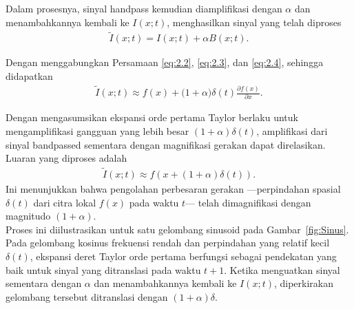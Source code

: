 Dalam prosesnya, sinyal handpass kemudian diamplifikasi dengan \(\alpha \) dan menambahkannya kembali ke \(I(x; t)\), menghasilkan sinyal yang telah diproses
\begin{equation} \label{eq:2.4}
\begin{aligned}
{\tilde I(x; t)  =  I(x; t)  +  }\alpha {B(x; t)}.
\end{aligned}
\end{equation}


Dengan menggabungkan Persamaan \ref{eq:2.2}, \ref{eq:2.3}, dan \ref{eq:2.4}, sehingga didapatkan 
\begin{equation} \label{eq:2.5}
\begin{aligned}
\tilde I(x; t) \approx {f(x)  +  (1 + }\alpha)\delta {(t)}\frac{{\partial f(x)}}{{\partial x}}.
\end{aligned}
\end{equation}

Dengan mengasumsikan ekspansi orde pertama Taylor berlaku untuk mengamplifikasi gangguan yang lebih besar \((1 +\alpha)\delta{(t)}\), amplifikasi dari sinyal bandpassed sementara dengan magnifikasi gerakan dapat direlasikan. Luaran yang diproses adalah
\begin{equation} \label{eq:2.6}
\begin{aligned}
\tilde I(x; t) \approx f(x  +  (1  + \alpha )\delta (t)).
\end{aligned}
\end{equation}
Ini menunjukkan bahwa pengolahan perbesaran gerakan ---perpindahan spasial  \(\delta (t)\) dari citra lokal \(f(x)\) pada waktu \(t\)--- telah dimagnifikasi dengan magnitudo \((1+\alpha)\).\\


Proses ini diilustrasikan untuk satu gelombang sinusoid pada Gambar~\ref{fig:Sinus}. Pada gelombang kosinus frekuensi rendah dan perpindahan yang relatif kecil \(\delta (t)\), ekspansi deret Taylor orde pertama berfungsi sebagai pendekatan yang baik untuk sinyal yang ditranslasi pada waktu \(t+1\). Ketika menguatkan sinyal sementara dengan \(\alpha\) dan menambahkannya kembali ke \(I(x; t)\), diperkirakan gelombang tersebut ditranslasi dengan \((1  + \alpha )\delta\).

